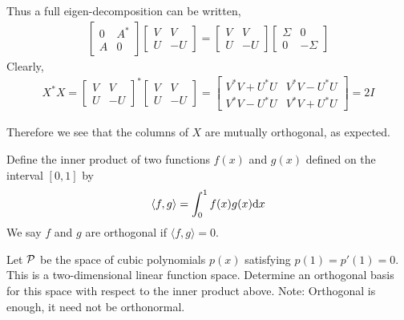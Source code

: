 \documentclass[10pt]{article}
\begin{document}
\begin{solution}[Solution]
Thus a full eigen-decomposition can be written,
\begin{align*}
\left[\begin{array}{rr}0 & A^* \\ A & 0 \end{array}\right]
\left[\begin{array}{rr}V&V\\U&-U\end{array}\right]
=
\left[\begin{array}{rr}V&V\\U&-U\end{array}\right]
\left[\begin{array}{rr}\Sigma & 0 \\ 0 & -\Sigma\end{array}\right]
\end{align*}
Clearly,
\begin{align*}
    X^*X
    = \left[\begin{array}{rr}V&V\\U&-U\end{array}\right]^*
    \left[\begin{array}{rr}V&V\\U&-U\end{array}\right]
    = \left[\begin{array}{cc}V^*V + U^*U & V^*V - U^*U \\   V^*V - U^*U & V^*V + U^*U\end{array}\right]
    = 2I
\end{align*}

Therefore we see that the columns of \( X \) are mutually orthogonal, as expected.
\end{solution}

\begin{problem}
Define the inner product of two functions \( f(x) \) and \( g(x) \) defined on the interval \( [0, 1]\)  by
\begin{align*}
    \langle f,g\rangle = \int_0^1 f(x)g(x)\mathrm{d} x
\end{align*}
We say \( f \) and \( g \) are orthogonal if \( \langle f,g\rangle = 0 \).

Let \( \mathcal{P} \) be the space of cubic polynomials \( p(x) \) satisfying \( p(1) = p'(1) = 0 \). This is a two-dimensional linear function space. Determine an orthogonal basis for this space with respect to the inner product above. Note: Orthogonal is enough, it need not be orthonormal.
\end{problem}
\end{document}
